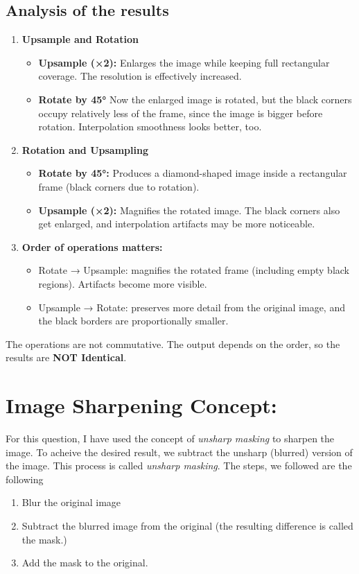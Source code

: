 \documentclass[12pt]{article}
\begin{document}
\subsection{Analysis of the results}
\begin{enumerate}[label = (\alph*)]
    \item \textbf{Upsample and Rotation}
    \begin{itemize}
    \item \textbf{Upsample (×2):} Enlarges the image while keeping full rectangular coverage. The resolution is effectively increased.

    \item \textbf{Rotate by 45°} Now the enlarged image is rotated, but the black corners occupy relatively less of the frame, since the image is bigger before rotation. Interpolation smoothness looks better, too.
    \end{itemize}
    \item \textbf{Rotation and Upsampling}
    \begin{itemize}
        \item \textbf{Rotate by 45°:}  Produces a diamond-shaped image inside a rectangular frame (black corners due to rotation).
        \item \textbf{Upsample (×2):} Magnifies the rotated image. The black corners also get enlarged, and interpolation artifacts may be more noticeable.
    \end{itemize}
    \item \textbf{Order of operations matters:}
    \begin{itemize}
        \item Rotate → Upsample: magnifies the rotated frame (including empty black regions). Artifacts become more visible.
        \item Upsample → Rotate: preserves more detail from the original image, and the black borders are proportionally smaller.
    \end{itemize}
\end{enumerate}
The operations are not commutative. The output depends on the order, so the results are \textbf{NOT Identical}.

\section{Image Sharpening Concept:}

For this question, I have used the concept of \textit{unsharp masking} to sharpen the image. To acheive the desired result, we subtract the unsharp (blurred) version of the image. This process is called \textit{unsharp masking}. The steps, we followed are the following
\begin{enumerate}
    \item Blur the original image
    \item Subtract the blurred image from the original (the resulting difference is
called the mask.)
    \item Add the mask to the original.
\end{enumerate}
\end{document}
